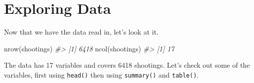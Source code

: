 \documentclass[
  12pt,
  openany]{book}
\newenvironment{Shaded}{\begin{snugshade}}{\end{snugshade}}
\newcommand{\CommentTok}[1]{\textcolor[rgb]{0.37,0.37,0.37}{\textit{#1}}}
\newcommand{\FunctionTok}[1]{\textcolor[rgb]{0,0,0}{#1}}
\newcommand{\NormalTok}[1]{#1}
\begin{document}
\hypertarget{exploring-data}{%
\section{Exploring Data}\label{exploring-data}}

Now that we have the data read in, let's look at it.

\begin{Shaded}
\begin{Highlighting}[]
\FunctionTok{nrow}\NormalTok{(shootings)}
\CommentTok{\#\textgreater{} [1] 6418}
\FunctionTok{ncol}\NormalTok{(shootings)}
\CommentTok{\#\textgreater{} [1] 17}
\end{Highlighting}
\end{Shaded}

The data has 17 variables and covers 6418 shootings. Let's check out some of the variables, first using \texttt{head()} then using \texttt{summary()} and \texttt{table()}.
\end{document}
